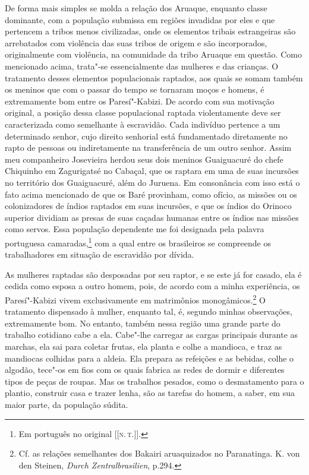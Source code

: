De forma mais simples se molda a relação dos Aruaque, enquanto classe
dominante, com a população submissa em regiões invadidas por eles e que
pertencem a tribos menos civilizadas, onde os elementos tribais
estrangeiras são arrebatados com violência das suas tribos de origem e
são incorporados, originalmente com violência, na comunidade da tribo
Aruaque em questão. Como mencionado acima, trata"-se essencialmente das
mulheres e das crianças. O tratamento desses elementos populacionais
raptados, aos quais se somam também os meninos que com o passar do
tempo se tornaram moços e homens, é extremamente bom entre os
Paresí"-Kabizi. De acordo com sua motivação original, a posição dessa
classe populacional raptada violentamente deve ser caracterizada como
semelhante à escravidão. Cada indivíduo pertence a um determinado
senhor, cujo direito senhorial está fundamentado diretamente no rapto de
pessoas ou indiretamente na transferência de um outro senhor. Assim meu
companheiro Josevieira herdou seus dois meninos Guaiguacuré do chefe
Chiquinho em Zagurigatsé no Cabaçal, que os raptara em uma de suas
incursões no território dos Guaiguacuré, além do Juruena. Em consonância
com isso está o fato acima mencionado de que os Baré provinham, como
ofício, as missões ou os colonizadores de índios raptados em suas
incursões, e que os índios do Orinoco superior dividiam as presas de
suas caçadas humanas entre os índios nas missões como servos. Essa
população dependente me foi designada pela palavra portuguesa
camaradas,\footnote{Em português no original {[}{[}\textsc{n.\,t.}{]}{]}.} com a qual entre os brasileiros se compreende os
trabalhadores em situação de escravidão por dívida.

As mulheres raptadas são desposadas por seu raptor, e se este já for
casado, ela é cedida como esposa a outro homem, pois, de acordo com a
minha experiência, os Paresí"-Kabizi vivem exclusivamente em matrimônios
monogâmicos.\footnote{Cf. as relações semelhantes dos Bakairi aruaquizados no Paranatinga.
  K. von den Steinen, \textit{Durch Zentralbrasilien}, p.294.} O
tratamento dispensado à mulher, enquanto tal, é, segundo minhas
observações, extremamente bom. No entanto, também nessa região uma
grande parte do trabalho cotidiano cabe a ela. Cabe"-lhe carregar as
cargas principais durante as marchas, ela sai para coletar frutas, ela
planta e colhe a mandioca, e traz as mandiocas colhidas para a aldeia.
Ela prepara as refeições e as bebidas, colhe o algodão, tece"-os em fios
com os quais fabrica as redes de dormir e diferentes tipos de peças de
roupas. Mas os trabalhos pesados, como o desmatamento para o plantio,
construir casa e trazer lenha, são as tarefas do homem, a saber, em sua
maior parte, da população súdita.

